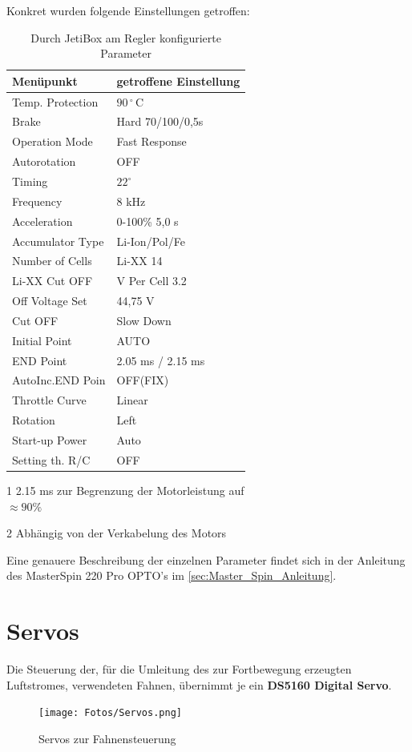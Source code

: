 Konkret wurden folgende Einstellungen getroffen:\\
\begin{table}[h]
\centering
\begin{threeparttable}
    
    \begin{tabular}{|l|l|}
    \hline
     Menüpunkt & getroffene Einstellung \\\hline
     Temp. Protection & $90\,^\circ\,\textrm{C}$\\
     Brake & Hard 70/100/0,5s\\
     Operation Mode & Fast Response\\
     Autorotation & OFF\\
     Timing & $22^\circ$\\
     Frequency & 8 kHz\\
     Acceleration & 0-100\% 5,0 s\\
     Accumulator Type & Li-Ion/Pol/Fe\\
     Number of Cells & Li-XX 14\\
     Li-XX Cut OFF & V Per Cell 3.2\\
     Off Voltage Set & 44,75 V\\
     Cut OFF & Slow Down\\
     Initial Point & AUTO\\
     END Point & 2.05 ms / 2.15 ms \tnote{1}\\
     AutoInc.END Poin & OFF(FIX)\\
     Throttle Curve & Linear\\
     Rotation & Left \tnote{2}\\
     Start-up Power & Auto\\
     Setting th. R/C & OFF\\\hline
    \end{tabular}
    \begin{tablenotes}\footnotesize 
        \item[1] 2.15 ms zur Begrenzung der Motorleistung auf \\$\approx 90\%$
        \item[2] Abhängig von der Verkabelung des Motors 
        \end{tablenotes}
    \end{threeparttable}
    \caption{Durch JetiBox am Regler konfigurierte Parameter}
\end{table}

Eine genauere Beschreibung der einzelnen Parameter findet sich in der Anleitung des MasterSpin 220 Pro OPTO's im \autoref{sec:Master_Spin_Anleitung}.

\newpage
\section{Servos}
Die Steuerung der, für die Umleitung des zur Fortbewegung erzeugten Luftstromes, verwendeten Fahnen, übernimmt je ein \textbf{DS5160 Digital Servo}.
\begin{figure}[h]
    \centering
    \texttt{[image: Fotos/Servos.png]}
    \caption{Servos zur Fahnensteuerung}
\end{figure}

\newpage